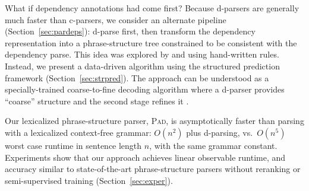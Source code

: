 \documentclass[11pt,letterpaper]{article}
\newcommand{\ParseName}{\textsc{Pad}\xspace}
\newcommand{\lpkcomment}[1]{\textcolor{red}{\bf \small [#1 --lpk]}}
\begin{document}
What if dependency annotations had come first?  Because d-parsers are
generally much faster than c-parsers, we consider an alternate
pipeline (Section~\ref{sec:pardeps}): d-parse first, then transform the dependency representation
into a phrase-structure tree constrained to be consistent with the
dependency parse.  This idea was explored by   and
 using hand-written rules.  Instead, we present a data-driven
algorithm using the structured prediction framework (Section~\ref{sec:strpred}).  The approach can be
understood as a specially-trained coarse-to-fine
decoding algorithm where a d-parser provides ``coarse'' structure and
the second stage refines it \cite{charniak2005coarse,petrov2007improved}.

Our lexicalized phrase-structure parser, \ParseName, is asymptotically faster than
parsing with a lexicalized context-free grammar: $O(n^2)$ plus
d-parsing, vs.~$O(n^5)$ worst case runtime in sentence length $n$,
with the same grammar constant.  Experiments show
that our approach achieves linear observable
runtime, and accuracy similar to
state-of-the-art phrase-structure parsers without reranking or
semi-supervised training (Section~\ref{sec:exper}).






\end{document}
